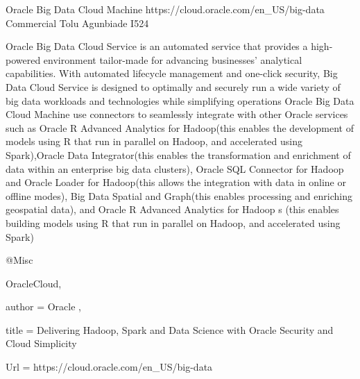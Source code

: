 Oracle Big Data Cloud Machine
https://cloud.oracle.com/en_US/big-data
Commercial
Tolu Agunbiade
I524

Oracle Big Data Cloud Service is an automated service that provides a high-powered environment tailor-made for advancing businesses’ analytical capabilities. With automated lifecycle management and one-click security, Big Data Cloud Service is designed to optimally and securely run a wide variety of big data workloads and technologies while simplifying operations\cite{hid-sp18-501-OracleCloud}
Oracle Big Data Cloud Machine use connectors to seamlessly integrate with other Oracle services such as Oracle R Advanced Analytics for Hadoop(this enables the development of  models using R that run in parallel on Hadoop, and accelerated using Spark),Oracle Data Integrator(this enables the transformation and enrichment of data within an enterprise big data clusters), Oracle SQL Connector for Hadoop and Oracle Loader for Hadoop(this allows the integration with data in online or offline modes), Big Data Spatial and Graph(this enables processing and enriching geospatial data), and Oracle R Advanced Analytics for Hadoop
s (this enables building models using R that run in parallel on Hadoop, and accelerated using Spark)\cite{hid-sp18-501-OracleCloud}

@Misc{OracleCloud,

  author = { Oracle },

  title        = {Delivering Hadoop, Spark and Data Science with Oracle Security and Cloud Simplicity}

  Url = {https://cloud.oracle.com/en_US/big-data }

}


